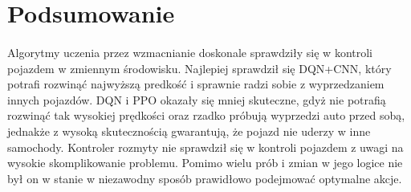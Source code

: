 \documentclass{article}
\begin{document}
\section{Podsumowanie}
\paragraph{}
Algorytmy uczenia przez wzmacnianie doskonale sprawdziły się w kontroli pojazdem w zmiennym środowisku. Najlepiej sprawdził się DQN+CNN, który potrafi rozwinąć najwyższą predkość i sprawnie radzi sobie z wyprzedzaniem innych pojazdów. DQN i PPO okazały się mniej skuteczne, gdyż nie potrafią rozwinąć tak wysokiej prędkości oraz rzadko próbują wyprzedzi auto przed sobą, jednakże z wysoką skutecznością gwarantują, że pojazd nie uderzy w inne samochody. Kontroler rozmyty nie sprawdził się w kontroli pojazdem z uwagi na wysokie skomplikowanie problemu. Pomimo wielu prób i zmian w jego logice nie był on w stanie w niezawodny sposób prawidłowo podejmować optymalne akcje.
\end{document}
